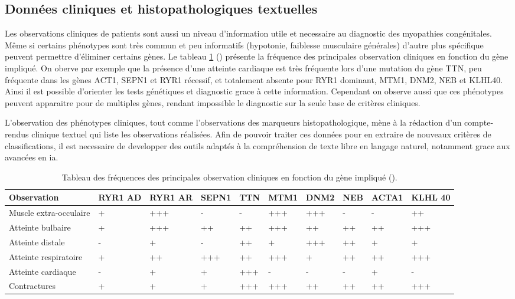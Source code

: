 \subsection{Données cliniques et histopathologiques textuelles }
Les observations cliniques de patients sont aussi un niveau d'information utile et necessaire au diagnostic des myopathies congénitales. Même si certains phénotypes sont très commun et peu informatifs (hypotonie, faiblesse musculaire générales) d'autre plus spécifique peuvent permettre d'éliminer certains gènes. Le tableau \ref{tab:clinic} (\cite{jungbluth_congenital_2018}) présente la fréquence des principales observation cliniques en fonction du gène impliqué. On oberve par exemple que la présence d'une atteinte cardiaque est très fréquente lors d'une mutation du gène TTN, peu fréquente dans les  gènes ACT1, SEPN1 et RYR1 récessif, et totalement absente pour RYR1 dominant, MTM1, DNM2, NEB et KLHL40. Ainsi il est possible d'orienter les tests génétiques et diagnostic grace à cette information. Cependant on observe aussi que ces phénotypes peuvent apparaitre pour de multiples gènes, rendant impossible le diagnostic sur la seule base de critères cliniques.

L'observation des phénotypes cliniques, tout comme l'observations des marqueurs histopathologique, mène à la rédaction d'un compte-rendus clinique textuel qui liste les observations réalisées. Afin de pouvoir traiter ces données pour en extraire de nouveaux critères de classifications, il est necessaire de developper des outils adaptés à la compréhension de texte libre en langage naturel, notamment grace aux avancées en \gls{ia}. 

\begin{table}[!ht]
\begin{tabularx}{\textwidth}{|p{1.8cm}|X|X|X|X|X|X|X|X|X|}
 \hline
\textbf{Observation} & \textbf{RYR1 AD} & \textbf{RYR1 AR} & \textbf{SEPN1} & \textbf{TTN} & \textbf{MTM1} & \textbf{DNM2} & \textbf{NEB} & \textbf{ACTA1} & \textbf{KLHL 40} \\
\hline
Muscle extra-occulaire & + & +++ & - & - & +++ & +++ & - & - & ++ \\
\hline
Atteinte bulbaire & + & +++ & ++ & ++ & +++ & ++ & ++ & ++ & +++ \\
\hline
Atteinte distale  & - & + & - & ++ & + & +++ & ++ & + & + \\
\hline
Atteinte respiratoire & + & ++ & +++ & ++ & +++ & + & ++ & ++ & +++ \\
\hline
Atteinte cardiaque & - & + & + & +++ & - & - & - & + & - \\
\hline
Contractures & + & + & + & +++ & +++ & ++ & ++ & ++ & +++ \\
\hline
\end{tabularx}
\caption{Tableau des fréquences des principales observation cliniques en fonction du gène impliqué (\cite{jungbluth_congenital_2018}). }
\label{tab:clinic}
\end{table}

